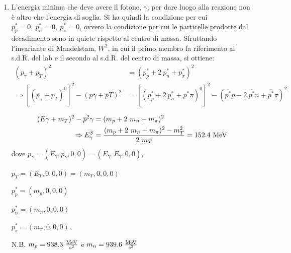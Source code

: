 \documentclass[12pt,twoside,a4]{article}
\begin{document}
 
\newpage
\begin{solution}
\begin{enumerate}[label=(\textit{\roman*})]
\vspace{-1cm}
\item L'energia minima che deve avere il fotone, $\gamma$, per dare luogo alla reazione non è altro che l'energia di soglia. Si ha quindi la condizione per cui $p^\ast_p = 0 , \ p^\ast_n = 0 , \ p^\ast_\pi = 0$, ovvero la condizione per cui le particelle prodotte dal decadimento sono in quiete rispetto al centro di massa.
Sfruttando l'invariante di Mandelstam, $W^2$, in cui il primo membro fa riferimento al s.d.R. del lab e il secondo al s.d.R. del centro di massa, si ottiene:
\begin{align*}
(p_\gamma + p_T)^2 &= (p^\ast_p + 2 \ p^\ast_n + p^\ast_\pi)^2 \\ \Rightarrow [(p_\gamma + p_T)^0]^2 - (\overline{p}\gamma + \overline{p}T)^2  &= [(p^\ast_p + 2 \ p^\ast_n + p^\ast\pi)^0]^2 - (\overline{p^\ast}p + 2 \ \overline{p^\ast}n + \overline{p^\ast}\pi)^2
\end{align*}

\begin{align*}
(E\gamma + m_T)^2 - \overline{p}^2\gamma &= (m_p + 2 \ m_n + m_\pi)^2 \\
\Rightarrow E^S_\gamma &= \frac{(m_p + 2 \ m_n + m_\pi)^2 - m^2_T}{2 \ m_T} = 152.4 \ \mathrm{MeV}
\end{align*}
dove $p_\gamma = (E_\gamma, \overline{p_\gamma},0,0) = (E_\gamma, E_\gamma, 0, 0)$, 

$p_T = (E_T, 0, 0, 0) = (m_T, 0 , 0 , 0)$

$p^\ast_p = (m_p, 0, 0, 0)$

$p^\ast_n = (m_n, 0, 0, 0)$

$p^\ast_\pi = (m_\pi, 0, 0, 0)$.


N.B. $m_p = 938.3 \ \frac{\mev}{c^2}$ e $m_n = 939.6 \ \frac{\mev}{c^2}$
\end{enumerate}
\end{solution}
\end{document}
